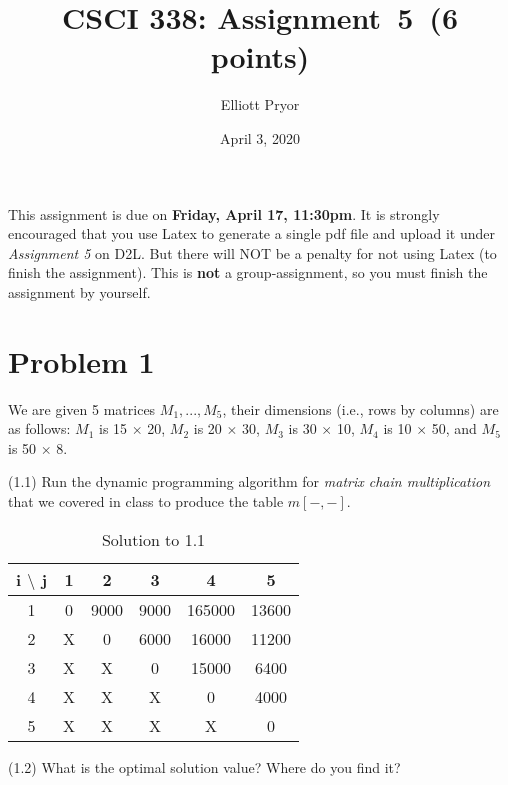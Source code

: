 \documentclass[11pt]{article}
\begin{document}
\date{April 3, 2020}
\title{CSCI 338: Assignment~5~(6 points)}

\author{Elliott Pryor}


\maketitle

\noindent
This assignment is due on {\bf Friday, April 17, 11:30pm}. It is strongly
encouraged that you use Latex to generate a single pdf file and upload it
under {\em Assignment 5} on D2L. But there will NOT be a penalty for not
using Latex (to finish the assignment). This is {\bf not} a group-assignment,
so you must finish the assignment by yourself.

\section*{Problem 1}

\noindent
We are given 5 matrices $M_1,...,M_5$, their dimensions (i.e., rows by columns)
are as follows: 
$M_1$ is 15 $\times$ 20,
$M_2$ is 20 $\times$ 30,
$M_3$ is 30 $\times$ 10,
$M_4$ is 10 $\times$ 50, and
$M_5$ is 50 $\times$ 8.
\newline

\noindent
(1.1) Run the dynamic programming algorithm for {\em matrix chain multiplication} that we covered in class to produce the table $m[-,-]$.


\begin{table}[H]
    \centering
    \begin{tabular}{c|c c c c c}
       i $\setminus$ j  & 1 & 2 & 3 & 4 & 5 \\
       \hline
       1 & 0 & 9000 & 9000 & 165000 & 13600 \\
       2 & X & 0 & 6000 & 16000 & 11200 \\
       3 & X & X & 0 & 15000 & 6400 \\
       4 & X & X & X & 0 & 4000\\
       5 & X & X & X & X & 0 \\
    \end{tabular}
    \caption{Solution to 1.1}
    \label{tab:1.1}
\end{table}


\noindent
(1.2) What is the optimal solution value? Where do you find it? 
\end{document}
